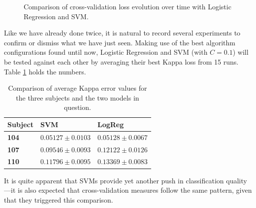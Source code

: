 \begin{figure}[bth]
\begin{center}
		\end{center}
		\caption[Cross-validation loss comparison with Logistic Regression and SVM]{Comparison of cross-validation loss evolution over time with Logistic Regression and SVM.}\label{gfx:fs_models_cv}

	\end{figure}

	Like we have already done twice, it is natural to record several experiments to confirm or dismiss what we have just seen. Making use of the best algorithm configurations found until now, Logistic Regression and \acs{SVM} (with $C = 0.1$) will be tested against each other by averaging their best Kappa loss from 15 runs. Table \ref{table:models_kappa} holds the numbers.

	\vspace{0.3cm}

	\begin{table}[h]

        \centering
        \setlength\arrayrulewidth{0.8pt}

        \begin{tabular}{| >{\centering\arraybackslash}m{0.5in} | >{\centering\arraybackslash}m{1.1in} | >{\centering\arraybackslash}m{1.1in} |}

            \hline
            \rowcolor{RoyalBlue}
            \textbf{Subject} & \textbf{SVM} & \textbf{LogReg} \\
            \hline
            \cellcolor{RoyalBlue}\textbf{104} & $0.05127 \pm 0.0103$ & $0.05128 \pm 0.0067$ \\
            \hline
            \cellcolor{RoyalBlue}\textbf{107} & $0.09546 \pm 0.0093$ & $0.12122 \pm 0.0126$ \\
            \hline
            \cellcolor{RoyalBlue}\textbf{110} & $0.11796 \pm 0.0095$ & $0.13369 \pm 0.0083$ \\
            \hline

        \end{tabular}

        \caption{Comparison of average Kappa error values for the three subjects and the two models in question.}\label{table:models_kappa}

    \end{table}

    It is quite apparent that \acs{SVM}s provide yet another push in classification quality---it is also expected that cross-validation measures follow the same pattern, given that they triggered this comparison.

